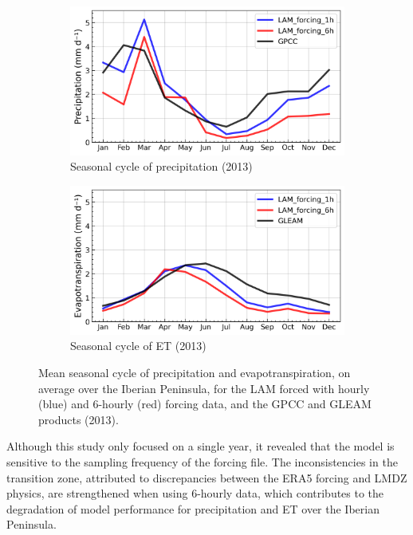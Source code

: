 \begin{figure}[htbp]
    \centering
    \begin{subfigure}[b]{0.49\textwidth}
        \caption{Seasonal cycle of precipitation (2013)}
        \includegraphics[width=\textwidth]{images/chap4/forcing_sampling_freq/IP_seasonal_cycle_precip.png}
    \end{subfigure}
    \begin{subfigure}[b]{0.49\textwidth}
        \caption{Seasonal cycle of ET (2013)}
        \includegraphics[width=\textwidth]{images/chap4/forcing_sampling_freq/IP_seasonal_cycle_evap.png}
    \end{subfigure}
    \caption{Mean seasonal cycle of precipitation and evapotranspiration, on average over the Iberian Peninsula, for the LAM forced with hourly (blue) and 6-hourly (red) forcing data, and the GPCC and GLEAM products (2013).}
    \label{fig:forcing_sampling_freq_SC}
\end{figure}

Although this study only focused on a single year, it revealed that the model is sensitive to the sampling frequency of the forcing file. The inconsistencies in the transition zone, attributed to discrepancies between the ERA5 forcing and LMDZ physics, are strengthened when using 6-hourly data, which contributes to the degradation of model performance for precipitation and ET over the Iberian Peninsula.

\clearpage
